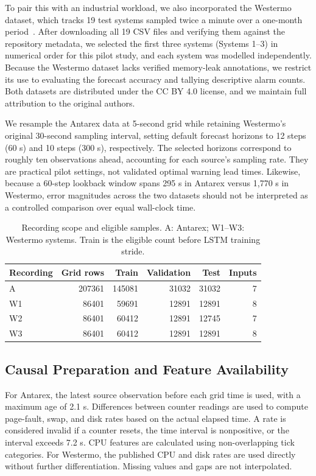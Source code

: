 \documentclass{llncs}
\begin{document}
To pair this with an industrial workload, we also incorporated the Westermo dataset, which tracks 19 test systems sampled twice a minute over a one-month period~\cite{ref6}. After downloading all 19 CSV files and verifying them against the repository metadata, we selected the first three systems (Systems 1--3) in numerical order for this pilot study, and each system was modelled independently. Because the Westermo dataset lacks verified memory-leak annotations, we restrict its use to evaluating the forecast accuracy and tallying descriptive alarm counts. Both datasets are distributed under the CC BY 4.0 license, and we maintain full attribution to the original authors.

We resample the Antarex data at 5-second grid while retaining Westermo's original 30-second sampling interval, setting default forecast horizons to 12 steps (60 s) and 10 steps (300 s), respectively. The selected horizons correspond to roughly ten observations ahead, accounting for each source’s sampling rate. They are practical pilot settings, not validated optimal warning lead times. Likewise, because a 60-step lookback window spans 295 s in Antarex versus 1,770 s in Westermo, error magnitudes across the two datasets should not be interpreted as a controlled comparison over equal wall-clock time.

\begin{table}[htbp]
\caption{Recording scope and eligible samples. A: Antarex; W1--W3: Westermo systems. Train is the eligible count before LSTM training stride.}
\label{tab:data}
\centering\small
\setlength{\tabcolsep}{5pt}
\begin{tabular}{@{}lrrrrr@{}}
\toprule
Recording & Grid rows & Train & Validation & Test & Inputs\\
\midrule
A &207361&145081&31032&31032&7\\
W1&86401&59691&12891&12891&8\\
W2&86401&60412&12891&12745&7\\
W3&86401&60412&12891&12891&8\\
\bottomrule
\end{tabular}
\end{table}

\subsection{Causal Preparation and Feature Availability}
For Antarex, the latest source observation before each grid time is used, with a maximum age of 2.1 s. Differences between counter readings are used to compute page-fault, swap, and disk rates based on the actual elapsed time. A rate is considered invalid if a counter resets, the time interval is nonpositive, or the interval exceeds 7.2 s. CPU features are calculated using non-overlapping tick categories. For Westermo, the published CPU and disk rates are used directly without further differentiation. Missing values and gaps are not interpolated.
\end{document}

